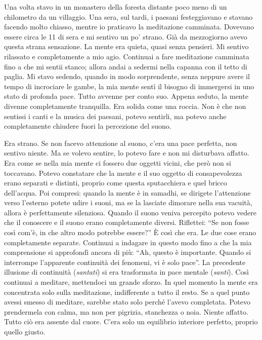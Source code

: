 Una volta stavo in un monastero della foresta distante poco meno di un
chilometro da un villaggio. Una sera, sul tardi, i paesani festeggiavano
e stavano facendo molto chiasso, mentre io praticavo la meditazione
camminata. Dovevano essere circa le 11 di sera e mi sentivo un po'
strano. Già da mezzogiorno avevo questa strana sensazione. La mente era
quieta, quasi senza pensieri. Mi sentivo rilassato e completamente a mio
agio. Continuai a fare meditazione camminata fino a che mi sentii
stanco; allora andai a sedermi nella capanna con il tetto di paglia. Mi
stavo sedendo, quando in modo sorprendente, senza neppure avere il tempo
di incrociare le gambe, la mia mente sentì il bisogno di immergersi in
uno stato di profonda pace. Tutto avvenne per conto suo. Appena seduto,
la mente divenne completamente tranquilla. Era solida come una roccia.
Non è che non sentissi i canti e la musica dei paesani, potevo sentirli,
ma potevo anche completamente chiudere fuori la percezione del suono.

Era strano. Se non facevo attenzione al suono, c'era una pace perfetta,
non sentivo niente. Ma se volevo sentire, lo potevo fare e non mi
disturbava affatto. Era come se nella mia mente ci fossero due oggetti
vicini, che però non si toccavano. Potevo constatare che la mente e il
suo oggetto di consapevolezza erano separati e distinti, proprio come
questa sputacchiera e quel bricco dell'acqua. Poi compresi: quando la
mente è in samadhi, se dirigete l'attenzione verso l'esterno potete
udire i suoni, ma se la lasciate dimorare nella sua vacuità, allora è
perfettamente silenziosa. Quando il suono veniva percepito potevo vedere
che il conoscere e il suono erano completamente diversi. Riflettei: ``Se
non fosse così com'è, in che altro modo potrebbe essere?'' È così che
era. Le due cose erano completamente separate. Continuai a indagare in
questo modo fino a che la mia comprensione si approfondì ancora di più:
``Ah, questo è importante. Quando si interrompe l'apparente continuità
dei fenomeni, vi è solo pace''. La precedente illusione di continuità
(\emph{santati}) si era trasformata in pace mentale (\emph{santi}). Così
continuai a meditare, mettendoci un grande sforzo. In quel momento la
mente era concentrata solo sulla meditazione, indifferente a tutto il
resto. Se a quel punto avessi smesso di meditare, sarebbe stato solo
perché l'avevo completata. Potevo prendermela con calma, ma non per
pigrizia, stanchezza o noia. Niente affatto. Tutto ciò era assente dal
cuore. C'era solo un equilibrio interiore perfetto, proprio quello
giusto.

